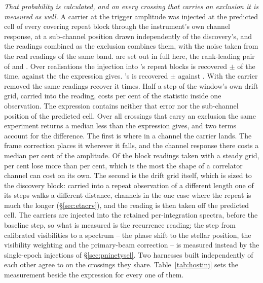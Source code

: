 \emph{That probability is calculated, and on every crossing that carries an
exclusion it is measured as well.} A
carrier at the trigger amplitude was injected at the predicted cell of every
covering repeat block through the instrument's own channel response, at a
sub-channel position drawn independently of the discovery's, and the readings
combined as the exclusion combines them, with the noise taken from the real
readings of the same band. \RjNMeas{} are set out in full here, the
rank-leading pair of \EvAStar{} and \EvBStar. Over \RjNReal{} realisations
the injection into \EvAStar's repeat blocks is recovered
\RjMeasSx$\pm$\RjErrSx{} of the time, against the \RqPowerTrigSx{} the
expression gives. \EvBStar's is recovered \RjMeasCp$\pm$\RjErrCp{} against
\RqPowerTrigCp. With the carrier removed the same readings recover it
\RjNFalse{} times.
Half a step of the window's own drift grid, carried into the reading, costs
\RjDriftPct{} per cent of the statistic inside one observation. The
expression contains neither that error nor the sub-channel position of the
predicted cell. Over all \HjNMeas{} crossings that carry an exclusion the
same experiment returns a median \HjDevMed{} less than the expression gives,
and two terms account for the difference. The first is where in a channel the
carrier lands. The frame correction places it wherever it falls, and the
channel response there costs a median \HjRespMedPct{} per cent of the
amplitude. Of the \HjNSteady{} block readings taken with a steady grid,
\HjRespOutPct{} per cent lose more than \HjRespBoundPct{} per cent, which is
the most the shape of a correlator channel can cost on its own. The second is the drift grid itself,
which is sized to the discovery block: carried into a repeat observation of a
different length one of its steps walks a different distance, \HjEtaWalkCh{}
channels in the one case where the repeat is much the longer
(\S\ref{sec:etacrv}), and the reading is then taken off the predicted
cell. The carriers are injected into the retained per-integration spectra,
before the baseline step, so what is measured is the recurrence reading; the
step from calibrated visibilities to a spectrum -- the phase shift to the
stellar position, the visibility weighting and the primary-beam correction --
is measured instead by the single-epoch injections of
\S\ref{sec:pninetysel}. Two harnesses built independently of each other agree
to \HjCrossDev{} on the crossings they share.
Table~\ref{tab:hostinj} sets the measurement beside the expression for every
one of them.

\begin{table}
\centering
\caption{\textbf{What an injected carrier at the trigger amplitude is
recovered at}, for each of the \HjNMeas{} crossings that carry an exclusion,
ordered by what is measured. $\nu_\star$ is the crossing's frequency in the
star's own rest frame, $\Phi$ the chance the expression above gives, and
beside it the fraction of $N$ realisations of the frozen reading that
recovered the carrier, with its binomial interval. The leading
\HjNPowerLo{} rows are the crossings reported untested rather than excluded.}
\label{tab:hostinj}
\scriptsize

\end{table}

